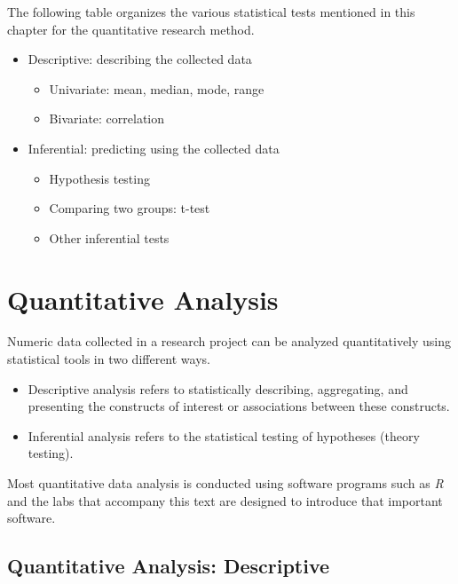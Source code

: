 The following table organizes the various statistical tests mentioned in this chapter for the quantitative research method.

\begin{itemize}
	\item Descriptive: describing the collected data
	\begin{itemize}
		\item Univariate: mean, median, mode, range
		\item Bivariate: correlation
	\end{itemize}

	\item Inferential: predicting using the collected data
	\begin{itemize}
		\item Hypothesis testing
		\item Comparing two groups: t-test
		\item Other inferential tests
	\end{itemize}

\end{itemize}

\section{Quantitative Analysis}

Numeric data collected in a research project can be analyzed quantitatively using statistical tools in two different ways. 

\begin{itemize}

	\item Descriptive analysis refers to statistically describing, aggregating, and presenting the constructs of interest or associations between these constructs. 

	\item Inferential analysis refers to the statistical testing of hypotheses (theory testing). 

\end{itemize}

Most quantitative data analysis is conducted using software programs such as \textit{R} and the labs that accompany this text are designed to introduce that important software.

\subsection{Quantitative Analysis: Descriptive}

